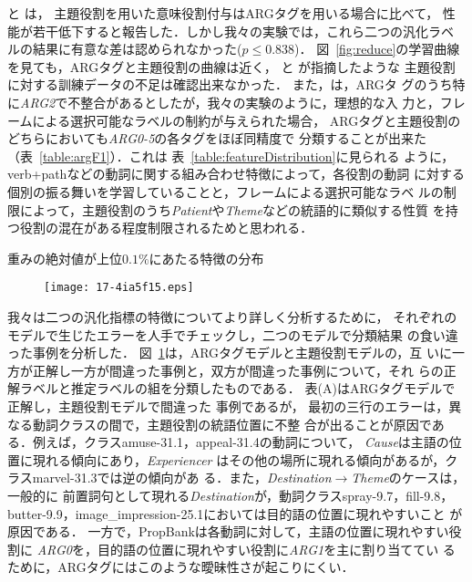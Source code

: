 \documentclass[japanese]{jnlp_1.4}
\begin{document}
と
は，
主題役割を用いた意味役割付与はARGタグを用いる場合に比べて，
性能が若干低下すると報告した．しかし我々の実験では，これら二つの汎化ラベ
ルの結果に有意な差は認められなかった($p \leq 0.838$)．
図~\ref{fig:reduce}の学習曲線を見ても，ARGタグと主題役割の曲線は近く，
と
が指摘したような
主題役割に対する訓練データの不足は確認出来なかった．
また，は，ARGタ
グのうち特に{\it ARG2}で不整合があるとしたが，我々の実験のように，理想的な入
力と，フレームによる選択可能なラベルの制約が与えられた場合，
ARGタグと主題役割のどちらにおいても{\it ARG0-5}の各タグをほぼ同精度で
分類することが出来た（表~\ref{table:argF1}）．これは
表~\ref{table:featureDistribution}に見られる
ように，verb+pathなどの動詞に関する組み合わせ特徴によって，各役割の動詞
に対する個別の振る舞いを学習していることと，フレームによる選択可能なラベ
ルの制限によって，主題役割のうち{\it Patient}や{\it Theme}などの統語的に類似する性質
を持つ役割の混在がある程度制限されるためと思われる．

\begin{table}[p]
\caption{重みの絶対値が上位$0.1\%$にあたる特徴の分布}
\label{table:featureDistribution}  

\end{table}

\begin{figure}[p]
\begin{center}
\texttt{[image: 17-4ia5f15.eps]}
\end{center}
\label{fig:errMap}
\end{figure}

我々は二つの汎化指標の特徴についてより詳しく分析するために，
それぞれのモデルで生じたエラーを人手でチェックし，二つのモデルで分類結果
の食い違った事例を分析した．
図~\ref{fig:errMap}は，ARGタグモデルと主題役割モデルの，互
いに一方が正解し一方が間違った事例と，双方が間違った事例について，それ
らの正解ラベルと推定ラベルの組を分類したものである．
表(A)はARGタグモデルで正解し，主題役割モデルで間違った
事例であるが，
最初の三行のエラーは，異なる動詞クラスの間で，主題役割の統語位置に不整
合が出ることが原因である．例えば，クラスamuse-31.1，appeal-31.4の動詞について，
{\it Cause}は主語の位置に現れる傾向にあり，{\it Experiencer}
はその他の場所に現れる傾向があるが，クラスmarvel-31.3では逆の傾向があ
る．また，{\it Destination}$\rightarrow${\it Theme}のケースは，一般的に
前置詞句として現れる{\it Destination}が，動詞クラスspray-9.7，fill-9.8，
butter-9.9，image\_impression-25.1においては目的語の位置に現れやすいこと
が原因である．
一方で，PropBankは各動詞に対して，主語の位置に現れやすい役割に {\it
ARG0}を，目的語の位置に現れやすい役割に{\it ARG1}を主に割り当ててい
るために，ARGタグにはこのような曖昧性さが起こりにくい．
\end{document}
